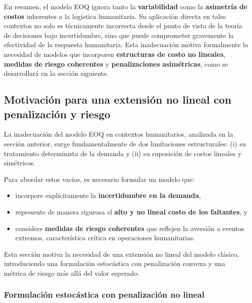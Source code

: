 \documentclass[
  spanish,
  us-letterpaper,
  DIV=11,
  numbers=noendperiod]{scrreprt}
\providecommand{\tightlist}{%
  \setlength{\itemsep}{0pt}\setlength{\parskip}{0pt}}
\numberwithin{equation}{section}
\begin{document}
En resumen, el modelo EOQ ignora tanto la \textbf{variabilidad} como la
\textbf{asimetría de costos} inherentes a la logística humanitaria. Su
aplicación directa en tales contextos no solo es técnicamente incorrecta
desde el punto de vista de la teoría de decisiones bajo incertidumbre,
sino que puede comprometer gravemente la efectividad de la respuesta
humanitaria. Esta inadecuación motiva formalmente la necesidad de
modelos que incorporen \textbf{estructuras de costo no lineales},
\textbf{medidas de riesgo coherentes} y \textbf{penalizaciones
asimétricas}, como se desarrollará en la sección siguiente.

\subsection{Motivación para una extensión no lineal con penalización y
riesgo}\label{motivaciuxf3n-para-una-extensiuxf3n-no-lineal-con-penalizaciuxf3n-y-riesgo}

La inadecuación del modelo EOQ en contextos humanitarios, analizada en
la sección anterior, surge fundamentalmente de dos limitaciones
estructurales: (i) su tratamiento determinista de la demanda y (ii) su
suposición de costos lineales y simétricos.

Para abordar estos vacíos, es necesario formular un modelo que:

\begin{itemize}
\tightlist
\item
  incorpore explícitamente la \textbf{incertidumbre en la demanda},\\
\item
  represente de manera rigurosa el \textbf{alto y no lineal costo de los
  faltantes}, y\\
\item
  considere \textbf{medidas de riesgo coherentes} que reflejen la
  aversión a eventos extremos, característica crítica en operaciones
  humanitarias.
\end{itemize}

Esta sección motiva la necesidad de una extensión no lineal del modelo
clásico, introduciendo una formulación estocástica con penalización
convexa y una métrica de riesgo más allá del valor esperado.

\subsubsection{Formulación estocástica con penalización no
lineal}\label{formulaciuxf3n-estocuxe1stica-con-penalizaciuxf3n-no-lineal}
\end{document}
